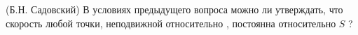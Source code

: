 (Б.Н. Садовский)
В условиях предыдущего вопроса можно ли утверждать, что скорость любой
точки, неподвижной относительно  , постоянна относительно $S$ ?
